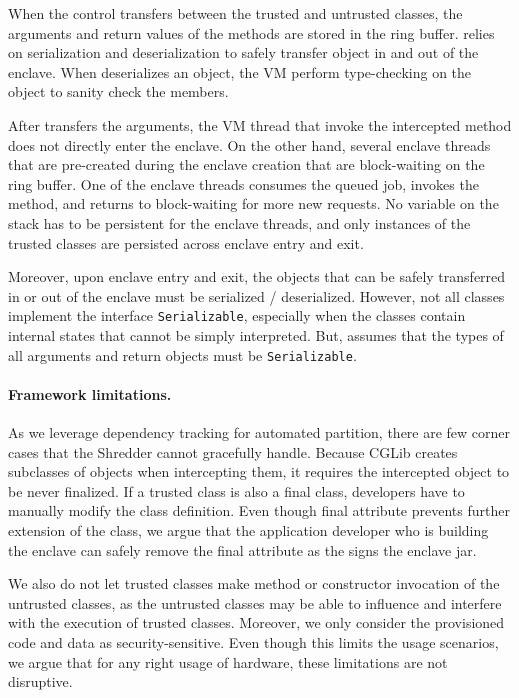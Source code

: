 When the control transfers between the trusted and untrusted classes,
the arguments and return values of the methods
are stored in the ring buffer.
\sysname{} relies on serialization and deserialization to safely transfer object in and out of the enclave.
When \sysname{} deserializes an object, the \java{} VM perform type-checking on the object to sanity check the members.

After \sysname{} transfers the arguments, the \java{} VM thread that
invoke the intercepted  method does not directly enter the enclave.
On the other hand, several enclave threads that are pre-created during the enclave creation that are block-waiting on the ring buffer.
One of the enclave threads consumes the queued job, invokes the method,
and returns to block-waiting for more new requests.
No variable on the stack has to be persistent for the enclave threads,
and only instances of the trusted classes are persisted across enclave entry and exit.

Moreover, upon enclave entry and exit, the objects that can be safely transferred in or out of the enclave must be serialized / deserialized.
However, not all classes implement the interface {\tt Serializable},
especially when the classes contain internal states that cannot be simply interpreted.
But, \sysname{} assumes that the types of all arguments and return objects must be {\tt Serializable}. 

\paragraph{Framework limitations.}

As we leverage dependency tracking for automated partition, there are few corner cases that the Shredder cannot gracefully handle.
Because CGLib creates subclasses of objects when intercepting them,
it requires the intercepted object to be never finalized.
If a trusted class is also a final class, developers have to manually modify the class definition. Even though final attribute prevents further extension of the class, we argue that the application developer who is building the enclave can safely remove the final attribute as the \sysname{} signs the enclave jar.

 We also do not let trusted classes make method or constructor invocation of the untrusted classes, as the untrusted classes may be able to influence and interfere with the execution of trusted classes. Moreover, we only consider the provisioned code and data as security-sensitive. Even though this limits the usage scenarios, we argue that for any right usage of \sgx{} hardware, these limitations are not disruptive.
